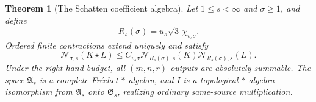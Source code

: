 \documentclass[11pt,a4paper]{amsart}
\numberwithin{equation}{section}
\newtheorem{theorem}{Theorem}[section]
\theoremstyle{definition}
\theoremstyle{remark}
\newcommand{\Alg}{\mathfrak A}
\newcommand{\Gaus}{\mathfrak G}
\newcommand{\Nn}[2]{\mathcal N_{#1,s}(#2)}
\begin{document}
\begin{theorem}[The Schatten coefficient algebra]\label{thm:nativeproduct}
Let $1\le s<\infty$ and $\sigma\ge1$, and define
\begin{equation}\label{eq:nativeradius}
 R_s(\sigma)=u_s\sqrt3\,\chi_{v_s\sigma}.
\end{equation}
Ordered finite contractions extend uniquely and satisfy
\begin{equation}\label{eq:nativeproduct}
 \Nn\sigma{K\star L}
 \le C_{v_s\sigma}\Nn{R_s(\sigma)}K\Nn{R_s(\sigma)}L.
\end{equation}
Under the right-hand budget, all $(m,n,r)$ outputs are absolutely summable. The space $\Alg_s$ is a complete Fr\'echet $*$-algebra, and $I$ is a topological $*$-algebra isomorphism from $\Alg_s$ onto $\Gaus_s$, realizing ordinary same-source multiplication.
\end{theorem}
\end{document}
